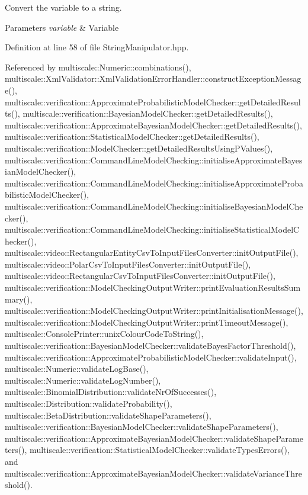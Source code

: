 Convert the variable to a string. 


\begin{DoxyParams}{Parameters}
{\em variable} & Variable \\
\hline
\end{DoxyParams}


Definition at line 58 of file String\-Manipulator.\-hpp.



Referenced by multiscale\-::\-Numeric\-::combinations(), multiscale\-::\-Xml\-Validator\-::\-Xml\-Validation\-Error\-Handler\-::construct\-Exception\-Message(), multiscale\-::verification\-::\-Approximate\-Probabilistic\-Model\-Checker\-::get\-Detailed\-Results(), multiscale\-::verification\-::\-Bayesian\-Model\-Checker\-::get\-Detailed\-Results(), multiscale\-::verification\-::\-Approximate\-Bayesian\-Model\-Checker\-::get\-Detailed\-Results(), multiscale\-::verification\-::\-Statistical\-Model\-Checker\-::get\-Detailed\-Results(), multiscale\-::verification\-::\-Model\-Checker\-::get\-Detailed\-Results\-Using\-P\-Values(), multiscale\-::verification\-::\-Command\-Line\-Model\-Checking\-::initialise\-Approximate\-Bayesian\-Model\-Checker(), multiscale\-::verification\-::\-Command\-Line\-Model\-Checking\-::initialise\-Approximate\-Probabilistic\-Model\-Checker(), multiscale\-::verification\-::\-Command\-Line\-Model\-Checking\-::initialise\-Bayesian\-Model\-Checker(), multiscale\-::verification\-::\-Command\-Line\-Model\-Checking\-::initialise\-Statistical\-Model\-Checker(), multiscale\-::video\-::\-Rectangular\-Entity\-Csv\-To\-Input\-Files\-Converter\-::init\-Output\-File(), multiscale\-::video\-::\-Polar\-Csv\-To\-Input\-Files\-Converter\-::init\-Output\-File(), multiscale\-::video\-::\-Rectangular\-Csv\-To\-Input\-Files\-Converter\-::init\-Output\-File(), multiscale\-::verification\-::\-Model\-Checking\-Output\-Writer\-::print\-Evaluation\-Results\-Summary(), multiscale\-::verification\-::\-Model\-Checking\-Output\-Writer\-::print\-Initialisation\-Message(), multiscale\-::verification\-::\-Model\-Checking\-Output\-Writer\-::print\-Timeout\-Message(), multiscale\-::\-Console\-Printer\-::unix\-Colour\-Code\-To\-String(), multiscale\-::verification\-::\-Bayesian\-Model\-Checker\-::validate\-Bayes\-Factor\-Threshold(), multiscale\-::verification\-::\-Approximate\-Probabilistic\-Model\-Checker\-::validate\-Input(), multiscale\-::\-Numeric\-::validate\-Log\-Base(), multiscale\-::\-Numeric\-::validate\-Log\-Number(), multiscale\-::\-Binomial\-Distribution\-::validate\-Nr\-Of\-Successes(), multiscale\-::\-Distribution\-::validate\-Probability(), multiscale\-::\-Beta\-Distribution\-::validate\-Shape\-Parameters(), multiscale\-::verification\-::\-Bayesian\-Model\-Checker\-::validate\-Shape\-Parameters(), multiscale\-::verification\-::\-Approximate\-Bayesian\-Model\-Checker\-::validate\-Shape\-Parameters(), multiscale\-::verification\-::\-Statistical\-Model\-Checker\-::validate\-Types\-Errors(), and multiscale\-::verification\-::\-Approximate\-Bayesian\-Model\-Checker\-::validate\-Variance\-Threshold().

